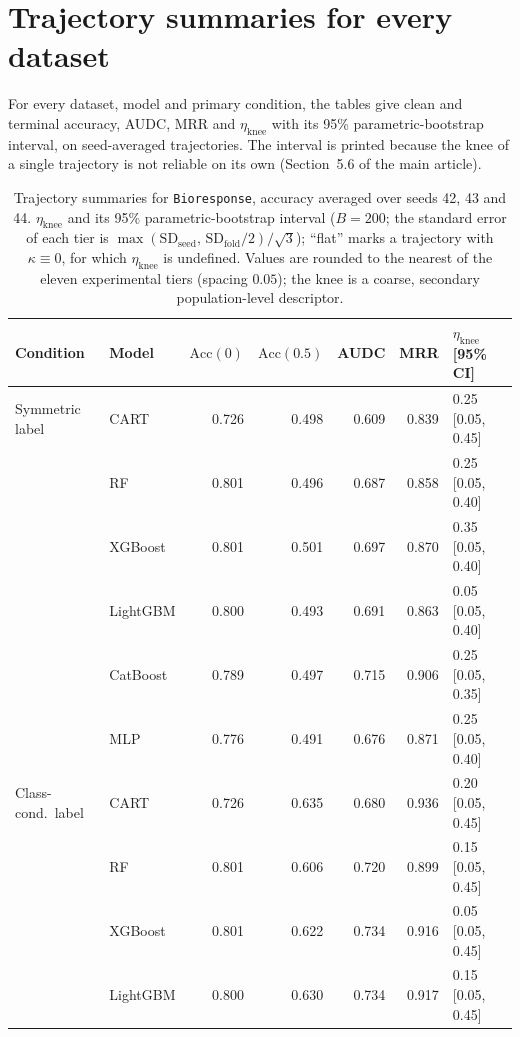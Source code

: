 \documentclass[pdflatex,sn-mathphys]{sn-jnl}
\newcommand{\etaknee}{\eta_{\mathrm{knee}}}
\theoremstyle{thmstyleone}
\begin{document}
\section{Trajectory summaries for every dataset}\label{sup:traj}
For every dataset, model and primary condition, the tables give clean and terminal accuracy, AUDC, MRR and $\etaknee$ with its 95\% parametric-bootstrap interval, on seed-averaged trajectories. The interval is printed because the knee of a single trajectory is not reliable on its own (Section~5.6 of the main article).
\begin{table}[htbp]
\centering
\scriptsize
\setlength{\tabcolsep}{3.5pt}
\caption{Trajectory summaries for \texttt{Bioresponse}, accuracy averaged over seeds 42, 43 and 44. $\eta_{\mathrm{knee}}$ and its 95\% parametric-bootstrap interval ($B=200$; the standard error of each tier is $\max(\mathrm{SD}_{\mathrm{seed}},\,\mathrm{SD}_{\mathrm{fold}}/2)/\sqrt3$); ``flat'' marks a trajectory with $\kappa\equiv 0$, for which $\eta_{\mathrm{knee}}$ is undefined. Values are rounded to the nearest of the eleven experimental tiers (spacing $0.05$); the knee is a coarse, secondary population-level descriptor.}
\label{tab:traj_Bioresponse}
\begin{tabular}{@{}llrrrrl@{}}
\toprule
Condition & Model & $\mathrm{Acc}(0)$ & $\mathrm{Acc}(0.5)$ & AUDC & MRR & $\eta_{\mathrm{knee}}$ [95\% CI] \\
\midrule
Symmetric label & CART & 0.726 & 0.498 & 0.609 & 0.839 & 0.25 [0.05, 0.45] \\
 & RF & 0.801 & 0.496 & 0.687 & 0.858 & 0.25 [0.05, 0.40] \\
 & XGBoost & 0.801 & 0.501 & 0.697 & 0.870 & 0.35 [0.05, 0.40] \\
 & LightGBM & 0.800 & 0.493 & 0.691 & 0.863 & 0.05 [0.05, 0.40] \\
 & CatBoost & 0.789 & 0.497 & 0.715 & 0.906 & 0.25 [0.05, 0.35] \\
 & MLP & 0.776 & 0.491 & 0.676 & 0.871 & 0.25 [0.05, 0.40] \\
\midrule
Class-cond.\ label & CART & 0.726 & 0.635 & 0.680 & 0.936 & 0.20 [0.05, 0.45] \\
 & RF & 0.801 & 0.606 & 0.720 & 0.899 & 0.15 [0.05, 0.45] \\
 & XGBoost & 0.801 & 0.622 & 0.734 & 0.916 & 0.05 [0.05, 0.45] \\
 & LightGBM & 0.800 & 0.630 & 0.734 & 0.917 & 0.15 [0.05, 0.45] \\

\end{tabular}
\end{table}
\end{document}
